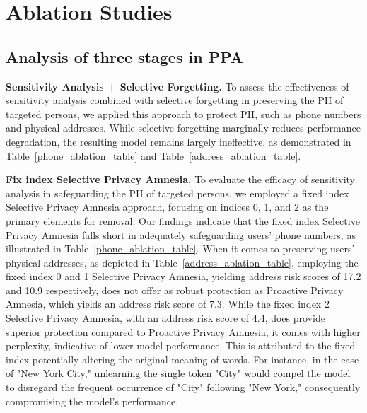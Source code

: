 \section{Ablation Studies}
























\subsection{Analysis of three stages in PPA}


\textbf{Sensitivity Analysis + Selective Forgetting.}
To assess the effectiveness of sensitivity analysis combined with selective forgetting in preserving the PII of targeted persons, we applied this approach to protect PII, such as phone numbers and physical addresses. While selective forgetting marginally reduces performance degradation, the resulting model remains largely ineffective, as demonstrated in Table~\ref{phone_ablation_table} and Table~\ref{address_ablation_table}.


\textbf{Fix index Selective Privacy Amnesia.}
To evaluate the efficacy of sensitivity analysis in safeguarding the PII of targeted persons, we employed a fixed index Selective Privacy Amnesia approach, focusing on indices 0, 1, and 2 as the primary elements for removal. Our findings indicate that the fixed index Selective Privacy Amnesia falls short in adequately safeguarding users' phone numbers, as illustrated in Table~\ref{phone_ablation_table}. When it comes to preserving users' physical addresses, as depicted in Table~\ref{address_ablation_table}, employing the fixed index 0 and 1 Selective Privacy Amnesia, yielding address risk scores of 17.2 and 10.9 respectively, does not offer as robust protection as Proactive Privacy Amnesia, which yields an address risk score of 7.3. While the fixed index 2 Selective Privacy Amnesia, with an address risk score of 4.4, does provide superior protection compared to Proactive Privacy Amnesia, it comes with higher perplexity, indicative of lower model performance. This is attributed to the fixed index potentially altering the original meaning of words. For instance, in the case of "New York City," unlearning the single token "City" would compel the model to disregard the frequent occurrence of "City" following "New York," consequently compromising the model's performance.

